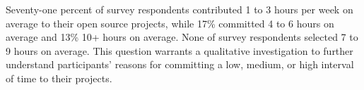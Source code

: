 Seventy-one percent of survey respondents contributed 1 to 3 hours per week on average to their open source projects, while 17\%
committed 4 to 6 hours on average and 13\% 10+ hours on average. None of survey respondents selected 7 to 9 hours on average. This question warrants 
a qualitative investigation to further understand participants' reasons for committing a low, medium, or high interval of 
time to their projects. 